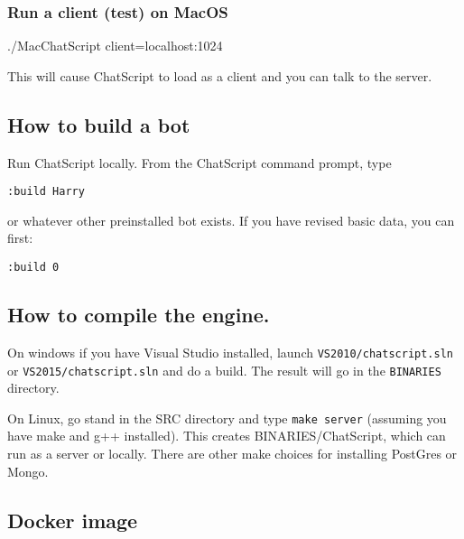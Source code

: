 \documentclass[]{article}
\newenvironment{Shaded}{}{}
\newcommand{\ExtensionTok}[1]{#1}
\newcommand{\NormalTok}[1]{#1}
\begin{document}
\subsubsection{Run a client (test) on
MacOS}\label{run-a-client-test-on-macos}

\begin{Shaded}
\begin{Highlighting}[]
\ExtensionTok{./MacChatScript}\NormalTok{ client=localhost:1024}
\end{Highlighting}
\end{Shaded}

This will cause ChatScript to load as a client and you can talk to the
server.

\subsection{How to build a bot}\label{how-to-build-a-bot}

Run ChatScript locally. From the ChatScript command prompt, type

\begin{verbatim}
:build Harry
\end{verbatim}

or whatever other preinstalled bot exists. If you have revised basic
data, you can first:

\begin{verbatim}
:build 0
\end{verbatim}

\subsection{How to compile the
engine.}\label{how-to-compile-the-engine.}

On windows if you have Visual Studio installed, launch
\texttt{VS2010/chatscript.sln} or \texttt{VS2015/chatscript.sln} and do
a build. The result will go in the \texttt{BINARIES} directory.

On Linux, go stand in the SRC directory and type \texttt{make\ server}
(assuming you have make and g++ installed). This creates
BINARIES/ChatScript, which can run as a server or locally. There are
other make choices for installing PostGres or Mongo.

\subsection{Docker image}\label{docker-image}
\end{document}
